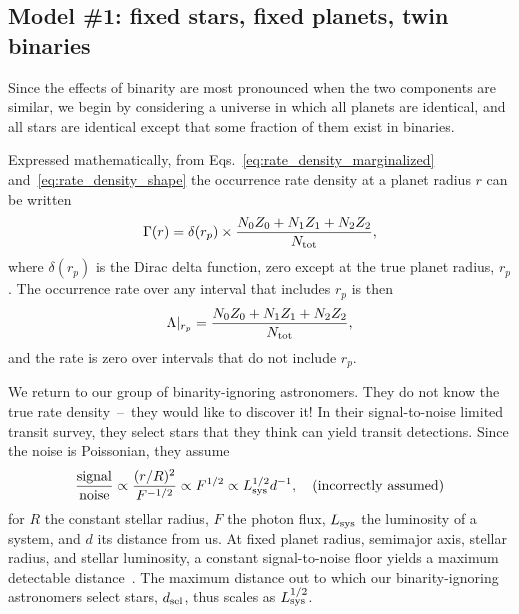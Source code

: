 \subsection{Model \#1: fixed stars, fixed planets, twin binaries}
\label{sec:model_1}

Since the effects of binarity are most pronounced when the two components are 
similar, we begin by considering a universe in which all planets are 
identical, and all stars are identical except that some fraction of them exist 
in binaries.

Expressed mathematically, from Eqs.~\ref{eq:rate_density_marginalized}
and~\ref{eq:rate_density_shape} the occurrence rate density at a planet radius 
$r$ can be written
\begin{equation}
\Gamma(r) = \delta(r_p) \times
\frac{
    N_0 Z_0 +
    N_1 Z_1 +
    N_2 Z_2
}{N_{\rm tot}},
\label{eq:model_1_rate_density}
\end{equation}
where $\delta(r_p)$ is the Dirac delta function, zero except at the true 
planet radius, $r_p$.
The occurrence rate over any interval that includes $r_p$ is then
\begin{equation}
\Lambda|_{r_p} = \frac{
    N_0 Z_0 +
    N_1 Z_1 +
    N_2 Z_2 
}{N_{\rm tot}},
\label{eq:model_1_rate}
\end{equation}
and the rate is zero over intervals that do not include $r_p$.

We return to our group of binarity-ignoring astronomers. They do 
not know the true rate density~--~they would like to discover it!
In their signal-to-noise limited transit survey, they select stars 
that they think can yield transit detections.
Since the noise is Poissonian, they assume
\begin{equation}
\frac{{\rm signal}}{{\rm noise}}
\propto \frac{(r/R)^2}{F^{-1/2}}
\propto F^{1/2}
\propto L_{\rm sys}^{1/2} d^{-1}, \quad ({\rm incorrectly\ assumed})
\end{equation}
for $R$ the constant stellar radius, $F$ the photon flux, $L_{\rm sys}$ the 
luminosity of a system, and $d$ its distance from us.
At fixed planet radius, semimajor axis, stellar radius, and stellar luminosity,
a constant signal-to-noise floor yields a maximum detectable 
distance~\citep{pepper_using_2003,pepper_searching_2005}.
The maximum distance out to which our binarity-ignoring astronomers 
select stars, $d_{\rm sel}$, thus scales as $L_{\rm sys}^{1/2}$.

